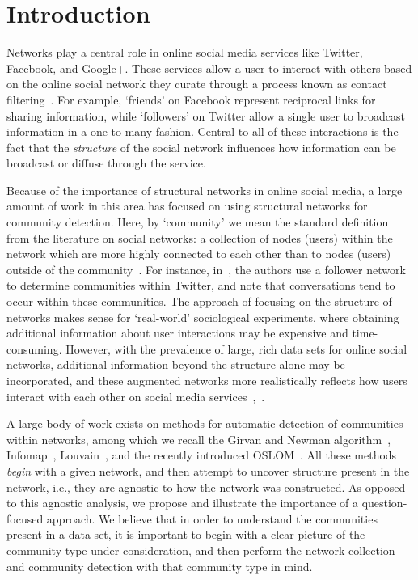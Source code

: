 \section{Introduction}

Networks play a central role in online social media services like Twitter, Facebook, and Google+. These services allow a user to interact with others based on the online social network they curate through a process known as contact filtering~\cite{cazabet2012automated}. For example, `friends' on Facebook represent reciprocal links for sharing information, while `followers' on Twitter allow a single user to broadcast information in a one-to-many fashion. Central to all of these interactions is the fact that the \emph{structure} of the social network influences how information can be broadcast or diffuse through the service.

Because of the importance of structural networks in online social media, a large amount of work in this area has focused on using structural networks for community detection. Here, by `community' we mean the standard definition from the literature on social networks: a collection of nodes (users) within the network which are more highly connected to each other than to nodes (users) outside of the community~\cite{girvan2002a, newman2004finding}. For instance, in~\cite{java2009we}, the authors use a follower network to determine communities within Twitter, and note that conversations tend to occur within these communities. The approach of focusing on the structure of networks makes sense for `real-world' sociological experiments, where obtaining additional information about user interactions may be expensive and time-consuming. However, with the prevalence of large, rich data sets for online social networks, additional information beyond the structure alone may be incorporated, and these augmented networks more realistically reflects how users interact with each other on social media services~\cite{nguyen2011adaptive},~\cite{grabowicz2012social}.

A large body of work exists on methods for automatic detection of communities within networks, among which we recall the Girvan and Newman algorithm~\cite{newman2004finding}, Infomap~\cite{Rosvall08mapsof}, Louvain~\cite{blondel2008fast}, and the recently introduced OSLOM~\cite{LancichinettiPlos}.
All these methods \emph{begin} with a given network, and then attempt to uncover structure present in the network, i.e., they are agnostic to how the network was constructed. As opposed to this agnostic analysis, we propose and illustrate the importance of a question-focused approach. We believe that in order to understand the communities present in a data set, it is important to begin with a clear picture of the community type under consideration, and then perform the network collection and community detection with that community type in mind.

